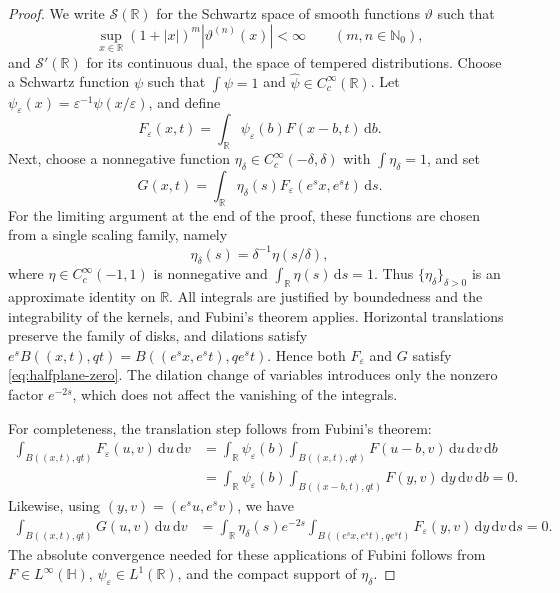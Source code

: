 \documentclass[12pt,a4paper]{article}
\theoremstyle{remark}
\newcommand{\dd}{\,\mathrm d}
\begin{document}
\begin{proof}
We write $\mathcal S(\mathbb R)$ for the Schwartz space of
smooth functions $\vartheta$ such that
\[
\sup_{x\in\mathbb R}
(1+|x|)^m |\vartheta^{(n)}(x)|<\infty
\qquad (m,n\in\mathbb N_0),
\]
and $\mathcal S'(\mathbb R)$ for its continuous dual,
the space of tempered distributions. Choose a Schwartz function $\psi$ such that $\int\psi=1$ and $\widehat\psi\in C_c^\infty(\mathbb R)$.
Let $\psi_\varepsilon(x)=\varepsilon^{-1}\psi(x/\varepsilon)$, and define
\[
F_\varepsilon(x,t)=\int_{\mathbb R}\psi_\varepsilon(b)F(x-b,t)\dd b.
\]
Next, choose a nonnegative function $\eta_\delta\in C_c^\infty(-\delta,\delta)$ with $\int\eta_\delta=1$, and set
\begin{equation}\label{eq:single-regularize}
G(x,t)=\int_{\mathbb R}\eta_\delta(s)F_\varepsilon(e^sx,e^st)\dd s.
\end{equation}
For the limiting argument at the end of the proof, these functions are chosen from a single scaling family, namely
\[
\eta_\delta(s)=\delta^{-1}\eta(s/\delta),
\]
where $\eta\in C_c^\infty(-1,1)$ is nonnegative and
$\int_{\mathbb R}\eta(s)\dd s=1$. Thus $\{\eta_\delta\}_{\delta>0}$ is an
approximate identity on $\mathbb R$.
All integrals are justified by boundedness and the integrability of the kernels, and Fubini's theorem applies.
Horizontal translations preserve the family of disks, and dilations satisfy
$e^s B((x,t),qt)=B((e^sx,e^st),qe^st)$.
Hence both $F_\varepsilon$ and $G$ satisfy \eqref{eq:halfplane-zero}.
The dilation change of variables introduces only the nonzero factor $e^{-2s}$, which does not affect the vanishing of the integrals.

For completeness, the translation step follows from Fubini's theorem:
\begin{align*}
\int_{B((x,t),qt)}F_\varepsilon(u,v)\dd u\dd v
&=\int_{\mathbb R}\psi_\varepsilon(b)
  \int_{B((x,t),qt)}F(u-b,v)\dd u\dd v\dd b\\
&=\int_{\mathbb R}\psi_\varepsilon(b)
  \int_{B((x-b,t),qt)}F(y,v)\dd y\dd v\dd b=0.
\end{align*}
Likewise, using $(y,v)=(e^su,e^sv)$, we have
\begin{align*}
\int_{B((x,t),qt)}G(u,v)\dd u\dd v
&=\int_{\mathbb R}\eta_\delta(s)e^{-2s}
  \int_{B((e^sx,e^st),qe^st)}F_\varepsilon(y,v)\dd y\dd v\dd s=0.
\end{align*}
The absolute convergence needed for these applications of Fubini follows from
$F\in L^\infty(\mathbb H)$, $\psi_\varepsilon\in L^1(\mathbb R)$, and the
compact support of $\eta_\delta$.



\end{proof}
\end{document}

